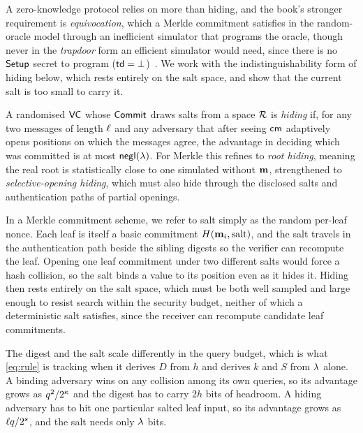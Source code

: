 \label{sec:hiding}

A zero-knowledge protocol relies on more than hiding, and the book's stronger requirement is
\emph{equivocation}, which a Merkle commitment satisfies in the random-oracle model through
an inefficient simulator that programs the oracle, though never in the \emph{trapdoor} form
an efficient simulator would need, since there is no $\mathsf{Setup}$ secret to program
($\mathsf{td}=\bot$)~\cite{CY26}.  We work with the indistinguishability form of hiding below, which
rests entirely on the salt space, and show that the current salt is too small to carry it.

\begin{definition}[Hiding]\label{def:vc-hiding}
A randomised $\mathsf{VC}$ whose $\mathsf{Commit}$ draws salts from a space $\mathcal{R}$ is
\emph{hiding} if, for any two messages of length $\ell$ and any
adversary that after seeing $\mathsf{cm}$ adaptively opens positions on which the
messages agree, the advantage in deciding which was committed is at most
$\mathsf{negl}(\lambda)$.  For Merkle this refines to \emph{root hiding}, meaning the real root is
statistically close to one simulated without $\mathbf{m}$, strengthened to
\emph{selective-opening hiding}, which must also hide through the disclosed
salts and authentication paths of partial openings.
\end{definition}

In a Merkle commitment scheme, we refer to salt simply as the random per-leaf nonce.
Each leaf is itself a basic commitment $H(\mathbf{m}_i,\text{salt})$, and the salt travels
in the authentication path beside the sibling digests so the verifier can recompute
the leaf.  Opening one leaf commitment under two different salts would force a
hash collision, so the salt binds a value to its position even as it hides it.
Hiding then rests entirely on the salt space, which must be both well sampled
and large enough to resist search within the security budget, neither of which a
deterministic salt satisfies, since the receiver can recompute candidate leaf commitments.

The digest and the salt scale differently in the query budget, which is what
\cref{eq:rule} is tracking when it derives $D$ from $h$ and derives $k$ and $S$ from
$\lambda$ alone.  A binding adversary wins on any collision among its own queries, so its
advantage grows as $q^2/2^{\kappa}$ and the digest has to carry $2h$ bits of
headroom.  A hiding adversary has to hit one particular salted leaf input, so its advantage
grows as $\ell q/2^{s}$, and the salt needs only $\lambda$ bits.

